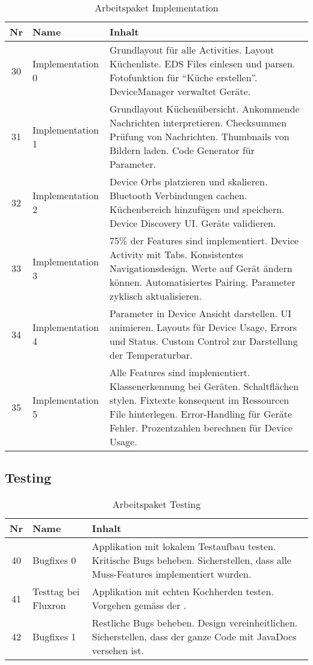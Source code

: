 \begin{table}[H]
\begin{tabularx}{\textwidth}{ c | l | X }
\textbf{Nr} & \textbf{Name} & \textbf{Inhalt} \\ \hline
30 & Implementation 0 & Grundlayout für alle Activities. Layout Küchenliste. EDS Files einlesen und parsen. Fotofunktion für \enquote{Küche erstellen}. DeviceManager verwaltet Geräte.\\ \hline
31 & Implementation 1 & Grundlayout Küchenübersicht. Ankommende Nachrichten interpretieren. Checksummen Prüfung von Nachrichten. Thumbnails von Bildern laden. Code Generator für Parameter.\\ \hline
32 & Implementation 2 & Device Orbs platzieren und skalieren. Bluetooth Verbindungen cachen. Küchenbereich hinzufügen und speichern. Device Discovery UI. Geräte validieren.\\ \hline
33 & Implementation 3 & 75\% der Features sind implementiert. Device Activity mit Tabs. Konsistentes Navigationsdesign. Werte auf Gerät ändern können. Automatisiertes Pairing. Parameter zyklisch aktualisieren. \\ \hline
34 & Implementation 4 & Parameter in Device Ansicht darstellen. UI animieren. Layouts für Device Usage, Errors und Status. Custom Control zur Darstellung der Temperaturbar.\\ \hline
35 & Implementation 5 & Alle Features sind implementiert. Klassenerkennung bei Geräten. Schaltflächen stylen. Fixtexte konsequent im Ressourcen File hinterlegen. Error-Handling für Geräte Fehler. Prozentzahlen berechnen für Device Usage.\\
\end{tabularx}
\caption{Arbeitspaket Implementation}
\end{table}

\subsection{Testing}

\begin{table}[H]
\begin{tabularx}{\textwidth}{ c | l | X }
\textbf{Nr} & \textbf{Name} & \textbf{Inhalt} \\ \hline
40 & Bugfixes 0 & Applikation mit lokalem Testaufbau testen. Kritische Bugs beheben. Sicherstellen, dass alle Muss-Features implementiert wurden.\\ \hline
41 & Testtag bei Fluxron & Applikation mit echten Kochherden testen. Vorgehen gemäss der \nameref{s:Systemtest_Spezifikation}. \\ \hline
42 & Bugfixes 1 & Restliche Bugs beheben. Design vereinheitlichen. Sicherstellen, dass der ganze Code mit JavaDocs versehen ist.\\ \hline
\end{tabularx}
\caption{Arbeitspaket Testing}
\end{table}

